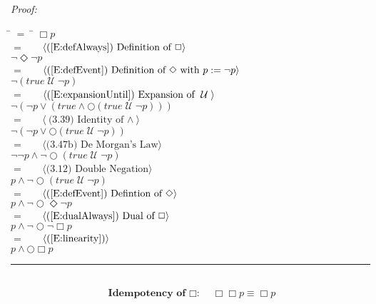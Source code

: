 \documentclass[fleqn, leqno]{article}
\newcommand{\lgap}{2pt}                             %
\newcommand{\mymathindent}{24pt}                      %
\newcommand{\until}{\;\mathcal{U}\;}
\newcommand{\next}{\bigcirc}
\newcommand{\event}{\Diamond}
\newcommand{\always}{\Box}
\newcommand{\myqed}{\hfill\rule[-.23ex]{1.2ex}{2.0ex}}
\newcommand{\Gll} {\langle}                         %
\newcommand{\Ggg} {\rangle}                         %
\newcommand{\Hint}[1]     {\ \ \ $\Gll              \mbox{#1} \Ggg$ }   %
\begin{document}
\emph{Proof:}
\begin{tabbing}
\hspace{\mymathindent} \= $= \;$ \= \kill
  \> \>   $\always p$\\[\lgap]
  \> $=$  \>  \Hint{(\ref{E:defAlways}) Definition of $\always$}\\[\lgap]
  \> \>   $\lnot\event\lnot p$\\[\lgap]
  \> $=$  \>  \Hint{(\ref{E:defEvent}) Definition of $\event$ with $p := \lnot p$}\\[\lgap]
  \> \>   $\lnot(true \until \lnot p)$\\[\lgap]
  \> $=$  \>  \Hint{(\ref{E:expansionUntil}) Expansion of $\until$}\\[\lgap]
  \> \>   $\lnot(\lnot p \lor (true \land \next(true \until \lnot p)))$\\[\lgap]
  \> $=$  \>  \Hint{(3.39) Identity of $\land$}\\[\lgap]
  \> \>   $\lnot(\lnot p \lor \next(true \until \lnot p))$\\[\lgap]
  \> $=$  \>  \Hint{(3.47b) De Morgan's Law}\\[\lgap]
  \> \>   $\lnot\lnot p \land \lnot\next(true \until \lnot p)$\\[\lgap]
  \> $=$  \>  \Hint{(3.12) Double Negation}\\[\lgap]
  \> \>   $p \land \lnot\next(true \until \lnot p)$\\[\lgap]
  \> $=$  \>  \Hint{(\ref{E:defEvent}) Defintion of $\event$}\\[\lgap]
  \> \>   $p \land \lnot\next\event\lnot p$\\[\lgap]
  \> $=$  \>  \Hint{(\ref{E:dualAlways}) Dual of $\always$}\\[\lgap]
  \> \>   $p \land \lnot\next\lnot\always p$\\[\lgap]
  \> $=$  \>  \Hint{(\ref{E:linearity})}\\[\lgap]
  \> \>   $p \land \next\always p$\\[\lgap]
\end{tabbing}
\myqed\\[\lgap]


\begin{equation}\label{E:IdemAlways}
\textbf{Idempotency of $\always$:}\quad \always\always p \equiv \always p
\end{equation}
\end{document}
